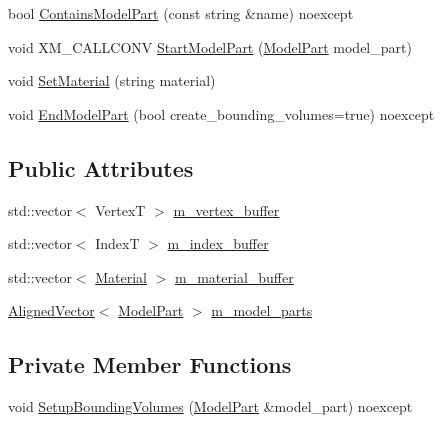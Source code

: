 \begin{DoxyCompactItemize}
\item 
bool \mbox{\hyperlink{structmage_1_1rendering_1_1_model_output_af90bf18a899dc6a41c7ff20c70c194ce}{Contains\+Model\+Part}} (const string \&name) noexcept
\item 
void X\+M\+\_\+\+C\+A\+L\+L\+C\+O\+NV \mbox{\hyperlink{structmage_1_1rendering_1_1_model_output_adc21b44bf476fa7704f97403c1539eb9}{Start\+Model\+Part}} (\mbox{\hyperlink{structmage_1_1rendering_1_1_model_part}{Model\+Part}} model\+\_\+part)
\item 
void \mbox{\hyperlink{structmage_1_1rendering_1_1_model_output_a54a18cb169cf1e1f1170fdb5fa2afee9}{Set\+Material}} (string material)
\item 
void \mbox{\hyperlink{structmage_1_1rendering_1_1_model_output_ad8f2948cb3ac35f3f25ed68fede20bce}{End\+Model\+Part}} (bool create\+\_\+bounding\+\_\+volumes=true) noexcept
\end{DoxyCompactItemize}
\subsection*{Public Attributes}
\begin{DoxyCompactItemize}
\item 
std\+::vector$<$ VertexT $>$ \mbox{\hyperlink{structmage_1_1rendering_1_1_model_output_a397e9daee731bb89683daa68bd4acd0f}{m\+\_\+vertex\+\_\+buffer}}
\item 
std\+::vector$<$ IndexT $>$ \mbox{\hyperlink{structmage_1_1rendering_1_1_model_output_a0290ea3f7afa5022cedbc9bc316d24e0}{m\+\_\+index\+\_\+buffer}}
\item 
std\+::vector$<$ \mbox{\hyperlink{classmage_1_1rendering_1_1_material}{Material}} $>$ \mbox{\hyperlink{structmage_1_1rendering_1_1_model_output_a7d290dd28d6cef9f33eead6cf30f042f}{m\+\_\+material\+\_\+buffer}}
\item 
\mbox{\hyperlink{namespacemage_a8664bfb5ce2179fc64eae9f82c8a5ba8}{Aligned\+Vector}}$<$ \mbox{\hyperlink{structmage_1_1rendering_1_1_model_part}{Model\+Part}} $>$ \mbox{\hyperlink{structmage_1_1rendering_1_1_model_output_a18da9c959800d0331488351612e25df2}{m\+\_\+model\+\_\+parts}}
\end{DoxyCompactItemize}
\subsection*{Private Member Functions}
\begin{DoxyCompactItemize}
\item 
void \mbox{\hyperlink{structmage_1_1rendering_1_1_model_output_a4b00228713e34d955cb5104c8592f7a0}{Setup\+Bounding\+Volumes}} (\mbox{\hyperlink{structmage_1_1rendering_1_1_model_part}{Model\+Part}} \&model\+\_\+part) noexcept
\end{DoxyCompactItemize}



